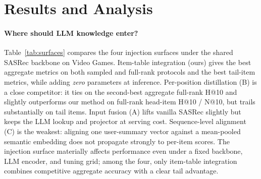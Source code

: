 \documentclass{article}
\begin{document}
\section{Results and Analysis}
\label{sec:results}


\paragraph{Where should LLM knowledge enter?}
Table~\ref{tab:surfaces} compares the four injection surfaces under
the shared SASRec backbone on Video Games. Item-table integration
(ours) gives the best aggregate metrics on both sampled and
full-rank protocols and the best tail-item metrics, while adding
\emph{zero} parameters at inference. Per-position distillation (B)
is a close competitor: it ties on the second-best aggregate full-rank
H@10 and slightly outperforms our method on full-rank head-item
H@10 / N@10, but trails substantially on tail items. Input fusion
(A) lifts vanilla SASRec slightly but keeps the LLM lookup and
projector at serving cost. Sequence-level alignment (C) is the
weakest: aligning one user-summary vector against a mean-pooled
semantic embedding does not propagate strongly to per-item scores.
The injection surface materially affects performance even under a
fixed backbone, LLM encoder, and tuning grid; among the four, only
item-table integration combines competitive aggregate accuracy
with a clear tail advantage.
\end{document}

